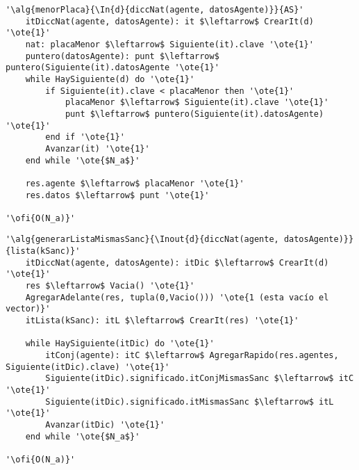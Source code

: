 \begin{lstlisting}[mathescape]
'\alg{menorPlaca}{\In{d}{diccNat(agente, datosAgente)}}{AS}'
	itDiccNat(agente, datosAgente): it $\leftarrow$ CrearIt(d) '\ote{1}'
	nat: placaMenor $\leftarrow$ Siguiente(it).clave '\ote{1}'
	puntero(datosAgente): punt $\leftarrow$ puntero(Siguiente(it).datosAgente '\ote{1}'
	while HaySiguiente(d) do '\ote{1}'
		if Siguiente(it).clave < placaMenor	then '\ote{1}'
			placaMenor $\leftarrow$ Siguiente(it).clave '\ote{1}'
			punt $\leftarrow$ puntero(Siguiente(it).datosAgente) '\ote{1}'
		end if '\ote{1}'
		Avanzar(it) '\ote{1}'
	end while '\ote{$N_a$}'

	res.agente $\leftarrow$ placaMenor '\ote{1}'
	res.datos $\leftarrow$ punt '\ote{1}'

'\ofi{O(N_a)}'
\end{lstlisting}

\begin{lstlisting}[mathescape]
'\alg{generarListaMismasSanc}{\Inout{d}{diccNat(agente, datosAgente)}}{lista(kSanc)}'
	itDiccNat(agente, datosAgente): itDic $\leftarrow$ CrearIt(d) '\ote{1}'
	res $\leftarrow$ Vacia() '\ote{1}'
	AgregarAdelante(res, tupla(0,Vacio())) '\ote{1 (esta vacío el vector)}'
	itLista(kSanc): itL $\leftarrow$ CrearIt(res) '\ote{1}'

	while HaySiguiente(itDic) do '\ote{1}'
		itConj(agente): itC $\leftarrow$ AgregarRapido(res.agentes, Siguiente(itDic).clave) '\ote{1}'
		Siguiente(itDic).significado.itConjMismasSanc $\leftarrow$ itC '\ote{1}'
		Siguiente(itDic).significado.itMismasSanc $\leftarrow$ itL '\ote{1}'
		Avanzar(itDic) '\ote{1}'
	end while '\ote{$N_a$}'

'\ofi{O(N_a)}'
\end{lstlisting}

